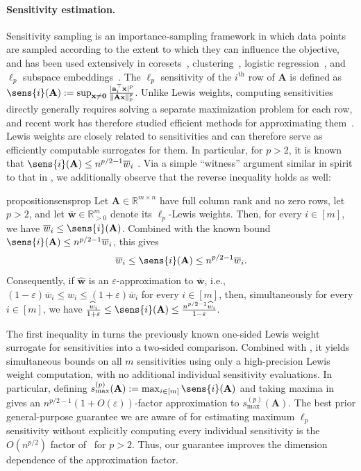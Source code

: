 \documentclass[11pt]{article}
\theoremstyle{plain}
\numberwithin{equation}{section}
\newcommand{\R}{\mathbb{R}}
\newcommand{\eps}{\varepsilon}
\newcommand{\Rmspos}{\mathbb{R}^m_{>0}}
\newcommand{\bA}{\mathbf{A}}
\newcommand{\bzero}{\mathbf{0}}
\newcommand{\ba}{\mathbf{a}}
\newcommand{\bx}{\mathbf{x}}
\newcommand{\bwhat}{\widehat{\mathbf{w}}}
\newcommand{\bwbar}{\overline{\mathbf{w}}}
\newcommand{\what}{\widehat{w}}
\newcommand{\wbar}{\overline{w}}
\newcommand{\maxsens}{s_{\max}^{(p)}}
\begin{document}
\paragraph{Sensitivity estimation.}
Sensitivity sampling is an importance-sampling framework in which data points are sampled according to the extent to which they can influence the objective, and has been used extensively in  coresets~\cite{langberg2010universal, varadarajan2012sensitivity}, clustering~\cite{feldman2011unified}, logistic regression~\cite{munteanu2018coresets}, and $\ell_p$ subspace embeddings~\cite{wy2023ICML}. 
The $\ell_p$ sensitivity of the $i^\mathrm{th}$ row of $\bA$ is defined as
$\sens{i}(\bA) := \sup_{\bx\neq \bzero} \frac{|\ba_i^\top \bx|^p}{\|\bA\bx\|_p^p}$.  
Unlike Lewis weights, computing sensitivities directly generally requires solving a separate maximization problem for each row, and recent work has therefore studied efficient methods for approximating them~\cite{padmanabhan2023computing}. 
 Lewis weights are closely related to sensitivities and can therefore serve as efficiently computable surrogates for them. In particular, for $p>2$, it is known that $\sens{i}(\bA) \leq n^{p/2-1}\wbar_i$ \cite[Fact~3.3]{padmanabhan2023computing}. Via a simple ``witness'' argument similar in spirit to that in
\cite[Fact~A.1]{padmanabhan2023computing}, we additionally observe that
the reverse inequality holds as well:
 
\begin{restatable}{proposition}{sensprop}\label{prop:sens}
Let $\bA\in\R^{m\times n}$ have full column rank and no zero rows, let $p>2$, and let $\bwbar\in\Rmspos$ denote its $\ell_p$-Lewis weights. Then, for every $i\in[m]$, we have  $\wbar_i\leq \sens{i}(\bA)$. Combined with the known bound $\sens{i}(\bA)\leq n^{p/2-1}\wbar_i$, this gives
\[\wbar_i\leq \sens{i}(\bA)\leq n^{p/2-1}\wbar_i.\]
Consequently, if $\bwhat$ is an $\eps$-approximation to $\bwbar$, i.e.,
$(1-\eps)\wbar_i\leq\what_i\leq(1+\eps)\wbar_i$ for every $i\in[m]$, then, simultaneously for every $i\in[m]$, we have 
$\frac{\what_i}{1+\eps}
\leq
\sens{i}(\bA)
\leq
\frac{n^{p/2-1}\what_i}{1-\eps}.$
\end{restatable}
 
 The first inequality in  turns the previously known one-sided Lewis weight surrogate for sensitivities into a two-sided comparison. Combined with , it yields simultaneous bounds on all $m$ sensitivities using only a high-precision Lewis weight computation, with no additional individual sensitivity evaluations. In particular, defining $\maxsens(\bA):=\max_{i\in[m]}\sens{i}(\bA)$ and taking maxima in  gives an $n^{p/2-1}(1+O(\eps))$-factor approximation to $\maxsens(\bA)$. The best prior general-purpose guarantee we are aware of for estimating maximum $\ell_p$ sensitivity without explicitly computing every individual sensitivity is the $O(n^{p/2})$ factor of~\cite{padmanabhan2023computing} for $p>2$. Thus, our guarantee improves the dimension dependence of the approximation factor. 
\end{document}
